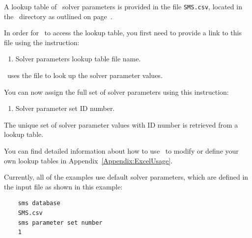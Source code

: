 \label{section:SolverParameters}
A lookup table of \mfus\ solver parameters is provided in the file \texttt{SMS.csv}, located in the \bin\ directory as outlined on page~\pageref{page:userbin}.

\pagebreak
In order for \mut\ to access the lookup table, you first need to provide a link to this file using the instruction:

    {
        \squish
        \begin{enumerate}
        \item {}  Solver parameters lookup table file name.
        \end{enumerate}
          \mut\ uses the file  to look up the solver parameter values.
    }

You can now assign the full set of solver parameters using this instruction:

    {
        \squish
        \begin{enumerate}
        \item {}  Solver parameter set ID number.
        \end{enumerate}
          The unique set of solver parameter values with ID number  is retrieved from a lookup table.
    }

You can find detailed information about how to use \excel\ to modify or define your own lookup tables in Appendix~\ref{Appendix:ExcelUsage}.

Currently, all of the examples use default solver parameters, which are defined in the input file as shown in this example:
\begin{verbatim}
    sms database
    SMS.csv
    sms parameter set number
    1
\end{verbatim}

